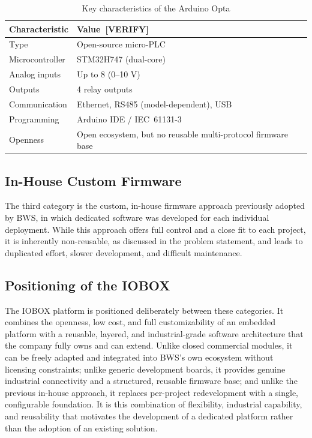 \begin{table}[H]
\centering
\caption{Key characteristics of the Arduino Opta \cite{arduino_opta}}
\label{tab:opta}
\renewcommand{\arraystretch}{1.3}
\begin{tabular}{|p{4.5cm}|p{7.5cm}|}
\hline
\textbf{Characteristic} & \textbf{Value~[VERIFY]} \\
\hline
Type & Open-source micro-PLC \\
\hline
Microcontroller & STM32H747 (dual-core) \\
\hline
Analog inputs & Up to 8 (0--10 V) \\
\hline
Outputs & 4 relay outputs \\
\hline
Communication & Ethernet, RS485 (model-dependent), USB \\
\hline
Programming & Arduino IDE / IEC~61131-3 \\
\hline
Openness & Open ecosystem, but no reusable multi-protocol firmware base \\
\hline
\end{tabular}
\end{table}
 
\subsection{In-House Custom Firmware}
 
The third category is the custom, in-house firmware approach previously adopted by
BWS, in which dedicated software was developed for each individual deployment. While
this approach offers full control and a close fit to each project, it is inherently
non-reusable, as discussed in the problem statement, and leads to duplicated effort,
slower development, and difficult maintenance.
 
\subsection{Positioning of the IOBOX}
The IOBOX platform is positioned deliberately between these categories. It combines
the openness, low cost, and full customizability of an embedded platform with a
reusable, layered, and industrial-grade software architecture that the company fully
owns and can extend. Unlike closed commercial modules, it can be freely adapted and
integrated into BWS's own ecosystem without licensing constraints; unlike generic
development boards, it provides genuine industrial connectivity and a structured,
reusable firmware base; and unlike the previous in-house approach, it replaces
per-project redevelopment with a single, configurable foundation. It is this
combination of flexibility, industrial capability, and reusability that motivates
the development of a dedicated platform rather than the adoption of an existing
solution.

